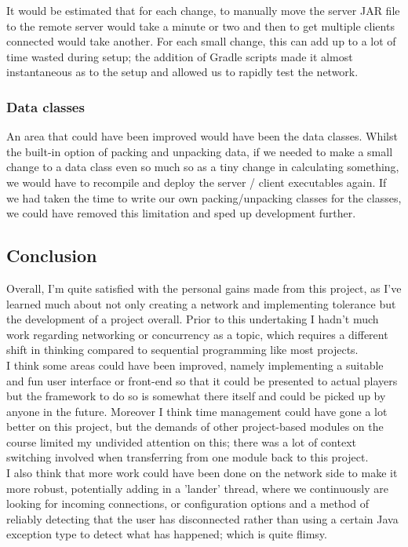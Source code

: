 \documentclass[11pt]{article}
\begin{document}
It would be estimated that for each change, to manually move the server JAR file to the remote server would take a minute or two and then to get multiple clients connected would take another. For each small change, this can add up to a lot of time wasted during setup; the addition of Gradle scripts made it almost instantaneous as to the setup and allowed us to rapidly test the network.

\subsubsection{Data classes}
An area that could have been improved would have been the data classes. Whilst the built-in option of packing and unpacking data, if we needed to make a small change to a data class even so much so as a tiny change in calculating something, we would have to recompile and deploy the server / client executables again. If we had taken the time to write our own packing/unpacking classes for the classes, we could have removed this limitation and sped up development further. 

\newpage
\subsection{Conclusion}

Overall, I'm quite satisfied with the personal gains made from this project, as I've learned much about not only creating a network and implementing tolerance but the development of a project overall. Prior to this undertaking I hadn't much work regarding networking or concurrency as a topic, which requires a different shift in thinking compared to sequential programming like most projects. \\

I think some areas could have been improved, namely implementing a suitable and fun user interface or front-end so that it could be presented to actual players but the framework to do so is somewhat there itself and could be picked up by anyone in the future. Moreover I think time management could have gone a lot better on this project, but the demands of other project-based modules on the course limited my undivided attention on this; there was a lot of context switching involved when transferring from one module back to this project.  \\

I also think that more work could have been done on the network side to make it more robust, potentially adding in a 'lander' thread, where we continuously are looking for incoming connections, or configuration options and a method of reliably detecting that the user has disconnected rather than using a certain Java exception type to detect what has happened; which is quite flimsy. 
\end{document}
